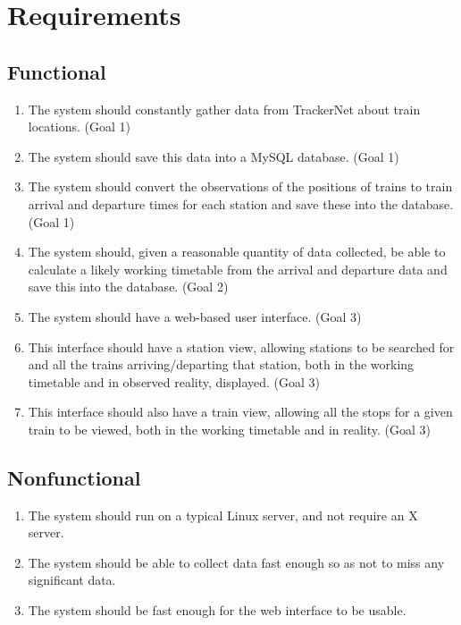 \documentclass[a4paper,12pt]{report}
\begin{document}
\chapter{Requirements}

\section{Functional}

\begin{enumerate}
  \item The system should constantly gather data from TrackerNet about train
    locations. (Goal 1)
  \item The system should save this data into a MySQL database. (Goal 1)
  \item The system should convert the observations of the positions of trains
    to train arrival and departure times for each station and save these into
    the database. (Goal 1)
  \item The system should, given a reasonable quantity of data collected, be
    able to calculate a likely working timetable from the arrival and departure
    data and save this into the database. (Goal 2)
  \item The system should have a web-based user interface. (Goal 3)
  \item This interface should have a station view, allowing stations to be
    searched for and all the trains arriving/departing that station, both in
    the working timetable and in observed reality, displayed. (Goal 3)
  \item This interface should also have a train view, allowing all the stops
    for a given train to be viewed, both in the working timetable and in
    reality. (Goal 3)
\end{enumerate}

\section{Nonfunctional}

\begin{enumerate}
  \item The system should run on a typical Linux server, and not require an X
    server.
  \item The system should be able to collect data fast enough so as not to miss
    any significant data.
  \item The system should be fast enough for the web interface to be usable.
\end{enumerate}
\end{document}
